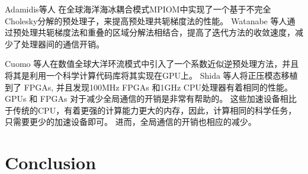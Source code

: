 Adamidis等人\cite{adamidis2011high} 在全球海洋海冰耦合模式MPIOM中实现了一个基于不完全 Cholesky分解的预处理子，来提高预处理共轭梯度法的性能。 
Watanabe \cite{Watanabe2006pcg} 等人通过预处理共轭梯度法和重叠的区域分解法相结合，提高了迭代方法的收敛速度，减少了处理器间的通信开销。 

 

Cuomo  \cite{cuomo2012pcg} 等人在数值全球大洋环流模式中引入了一个系数近似逆预处理方法，并且将其是利用一个科学计算代码库将其实现在GPU上。
Shida  \cite{Shida2007}等人将正压模态移植到了 FPGAs, 并且发现100MHz FPGAs 和1GHz CPU处理器有着相同的性能。 
GPUs 和 FPGAs 对于减少全局通信的开销是非常有帮助的。
这些加速设备相比于传统的CPU，有着更强的计算能力更大的内存，因此，计算相同的科学任务，只需要更少的加速设备即可。 进而，全局通信的开销也相应的减少。 

\section{Conclusion} \label{se:conc}
 







